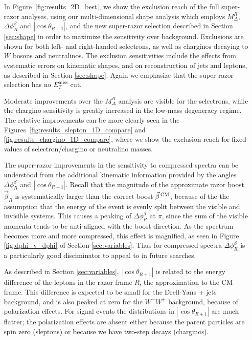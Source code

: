 In Figure~\ref{fig:results_2D_best}, we show the exclusion reach of the full super-razor analyses, using our multi-dimensional shape analysis which employs $M_\Delta^R$, $\Delta\phi_R^\beta$ and $|\cos\theta_{R+1}|$, and the new super-razor selection described in Section \ref{sec:shape} in order to maximize the sensitivity over background. Exclusions are shown for both left- and right-handed selectrons, as well as charginos decaying to $W$ bosons and neutralinos.  The exclusion sensitivities include the
effects from systematic errors on kinematic shapes, and on reconstruction of jets and leptons,
as described in Section \ref{sec:shape}. Again we emphasize that the
super-razor selection has no $E_{T}^\text{miss}$ cut.

Moderate improvements over the $M_\Delta^R$ analysis are visible for the selectrons, while the chargino sensitivity is greatly increased in the low-mass degeneracy regime. The relative improvements can be more clearly seen in the Figures~\ref{fig:results_slepton_1D_compare} and \ref{fig:results_chargino_1D_compare}, where we show the exclusion reach for fixed values of selectron/chargino or neutralino masses.

The super-razor improvements in the sensitivity to compressed spectra can be understood from
the additional kinematic information provided by the angles $\Delta\phi_R^\beta$ and $|\cos\theta_{R+1}|$. Recall that the magnitude of the approximate razor boost $\vec{\beta}_R$ is systematically larger than the correct boost $\vec{\beta}^{\, \rm CM}$, because of the the assumption that the energy of the event is evenly split between the visible and invisible systems. This causes a peaking of $\Delta\phi_R^\beta$ at $\pi$, since the sum of the visible momenta tends to be anti-aligned with the boost direction. As the spectrum becomes more and more compressed, this effect is magnified, as seen in Figure \ref{fig:dphi_v_dphi} of Section \ref{sec:variables}. Thus for compressed spectra  $\Delta\phi_R^\beta$ is a particularly good disciminator to appeal to in future searches.

As described in Section \ref{sec:variables}, $|\cos\theta_{R+1}|$ is related to the energy
difference of the leptons in the razor frame $R$, the approximation to the CM frame.
This difference is expected to be small for the Drell-Yans + jets background, and is also
peaked at zero for the $W^-W^+$ background, because of polarization effects.
For signal events the distributions in $|\cos\theta_{R+1}|$ are much flatter; the
polarization effects are absent either because the parent particles are spin zero
(sleptons) or because we have two-step decays (charginos).

